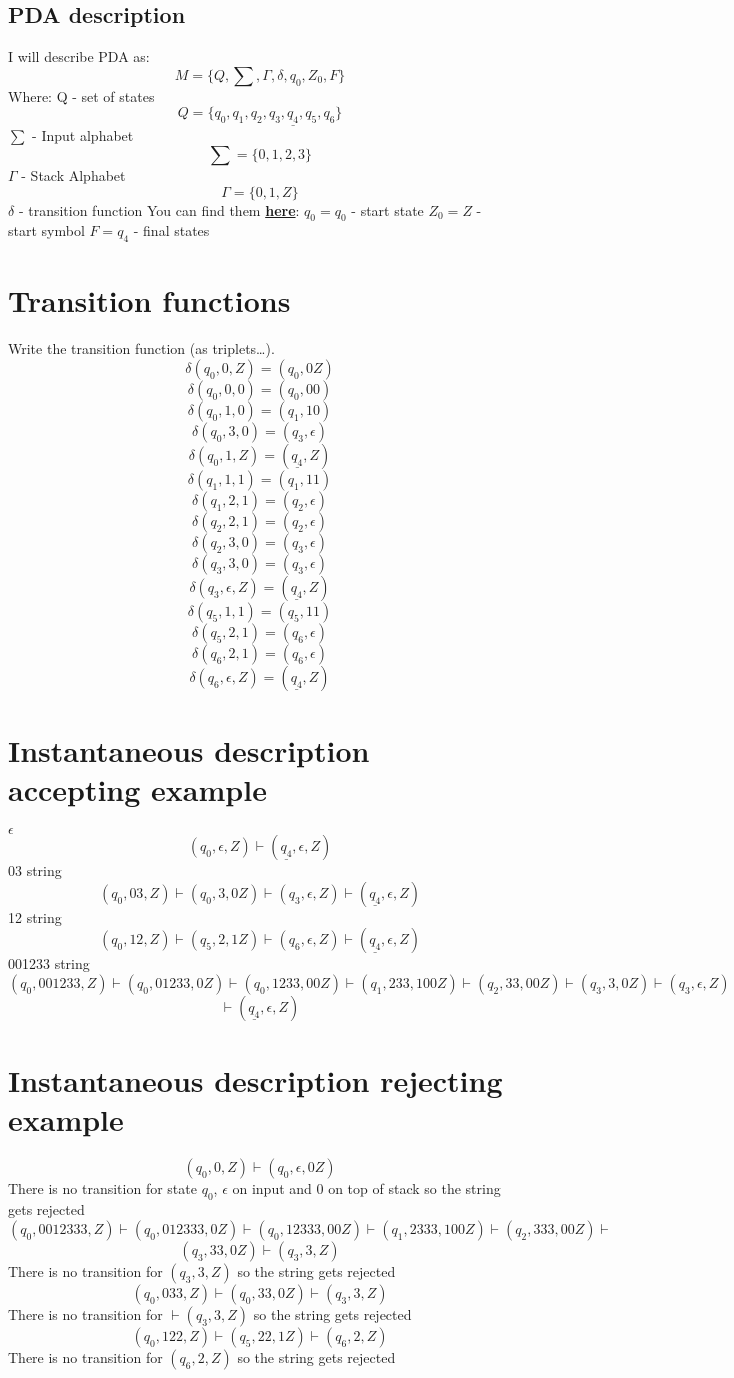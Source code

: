 \documentclass{report}[pt12]
\begin{document}
\section{PDA description}
I will describe PDA as:
\[ M = \{Q, \sum, \Gamma, \delta, q_0, Z_0, F \} \]
Where:
Q - set of states
\[ Q = \{q_0, q_1, q_2, q_3, \underline{q_4}, q_5, q_6\} \]
$\sum$ - Input alphabet
\[ \sum = \{0, 1, 2, 3 \} \]
$\Gamma$ - Stack Alphabet
\[ \Gamma = \{ 0, 1, Z \} \]
$\delta$ - transition function
You can find them \hyperlink{transition}{\textbf{here}}:
$q_0 = q_0$ - start state
$Z_0 = Z$ - start symbol
$F = q_4$ - final states



\hypertarget{transition}{\chapter{Transition functions}}
Write the transition function (as triplets…).
\[ \delta(q_0, 0, Z) = (q_0, 0Z) \]
\[ \delta(q_0, 0, 0) = (q_0, 00) \]
\[ \delta(q_0, 1, 0) = (q_1, 10) \]
\[ \delta(q_0, 3, 0) = (q_3, \epsilon) \]
\[ \delta(q_0, 1, Z) = (\underline{q_4}, Z) \]
\[ \delta(q_1, 1, 1) = (q_1, 11) \]
\[ \delta(q_1, 2, 1) = (q_2, \epsilon) \]
\[ \delta(q_2, 2, 1) = (q_2, \epsilon) \]
\[ \delta(q_2, 3, 0) = (q_3, \epsilon) \]
\[ \delta(q_3, 3, 0) = (q_3, \epsilon) \]
\[ \delta(q_3, \epsilon, Z) = (\underline{q_4}, Z) \]
\[ \delta(q_5, 1, 1) = (q_5, 11) \]
\[ \delta(q_5, 2, 1) = (q_6, \epsilon) \]
\[ \delta(q_6, 2, 1) = (q_6, \epsilon) \]
\[ \delta(q_6, \epsilon, Z) = (\underline{q_4}, Z) \]

\chapter{Instantaneous description accepting example}
$\epsilon$
\[ (q_0, \epsilon, Z) \vdash (\underline{q_4}, \epsilon, Z) \]
03 string
\[ (q_0, 03, Z) \vdash (q_0, 3, 0Z) \vdash (q_3, \epsilon, Z) \vdash (\underline{q_4}, \epsilon, Z) \]
12 string
\[ (q_0, 12, Z) \vdash (q_5, 2, 1Z) \vdash (q_6, \epsilon, Z) \vdash (\underline{q_4}, \epsilon, Z) \]
001233 string
\[ (q_0, 001233, Z) \vdash (q_0, 01233, 0Z) \vdash (q_0, 1233, 00Z) \vdash (q_1, 233, 100Z) \vdash (q_2, 33, 00Z) \vdash (q_3, 3, 0Z) \vdash (q_3, \epsilon, Z) \]
\[ \vdash (\underline{q_4}, \epsilon, Z) \]
\chapter{Instantaneous description rejecting example}
\[ (q_0, 0, Z) \vdash (q_0, \epsilon, 0Z) \]
There is no transition for state $q_0$, $\epsilon$ on input and 0 on top of stack so the string gets rejected
\[ (q_0, 0012333, Z) \vdash (q_0, 012333, 0Z) \vdash (q_0, 12333, 00Z) \vdash (q_1, 2333, 100Z) \vdash (q_2, 333, 00Z) \vdash \]
\[ (q_3, 33, 0Z) \vdash (q_3, 3, Z) \]
There is no transition for $(q_3, 3, Z)$ so the string gets rejected
\[ (q_0, 033, Z) \vdash (q_0, 33, 0Z) \vdash (q_3, 3, Z) \]
There is no transition for $\vdash (q_3, 3, Z)$ so the string gets rejected
\[ (q_0, 122, Z) \vdash (q_5, 22, 1Z) \vdash (q_6, 2, Z) \]
There is no transition for $(q_6, 2, Z)$ so the string gets rejected
\end{document}

